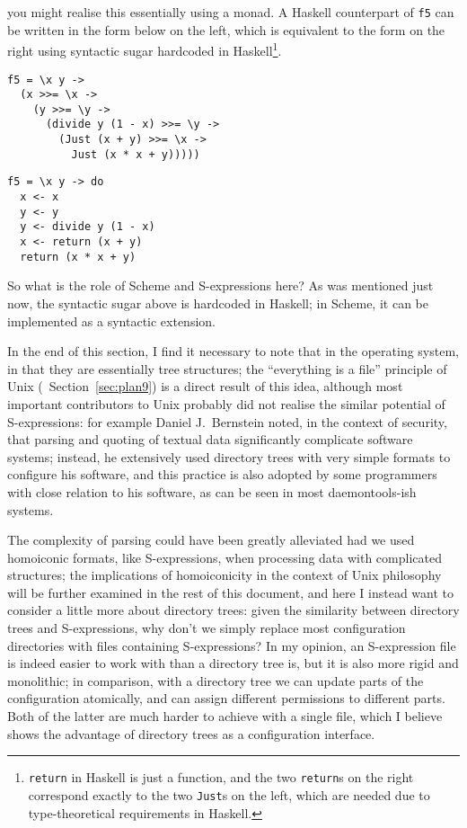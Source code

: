 you might realise this essentially using a monad.  A Haskell counterpart of
\verb|f5| can be written in the form below on the left, which is equivalent
to the form on the right using syntactic sugar hardcoded in Haskell\footnote%
{\texttt{return} in Haskell is just a function, and the two \texttt{return}s
on the right correspond exactly to the two \texttt{Just}s on the left,
which are needed due to type-theoretical requirements in Haskell.}.
\colskipa\begin{multicols}{2}
\begin{wquoting}
\begin{Verbatim}
f5 = \x y ->
  (x >>= \x ->
    (y >>= \y ->
      (divide y (1 - x) >>= \y ->
        (Just (x + y) >>= \x ->
          Just (x * x + y)))))
\end{Verbatim}
\end{wquoting}
\begin{wquoting}
\begin{Verbatim}
f5 = \x y -> do
  x <- x
  y <- y
  y <- divide y (1 - x)
  x <- return (x + y)
  return (x * x + y)
\end{Verbatim}
\end{wquoting}
\end{multicols}\colskipb\noindent%
So what is the role of Scheme and S-expressions here?  As was mentioned
just now, the syntactic sugar above is hardcoded in Haskell;
in Scheme, it can be implemented as a syntactic extension.

In the end of this section, I find it necessary to note that in the operating
system,  in that they are
essentially tree structures; the ``everything is a file'' principle of Unix
(\cf~Section~\ref{sec:plan9}) is a direct result of this idea, although
most important contributors to Unix probably did not realise the similar
potential of S-expressions: for example Daniel J.\ Bernstein noted, in the
context of security, that parsing and quoting of textual data significantly
complicate software systems; instead, he extensively
used directory trees with very simple formats to configure his software, and
this practice is also adopted by some programmers with close relation
to his software, as can be seen in most daemontools-ish systems.

The complexity of parsing could have been greatly alleviated had we used
homoiconic formats, like S-expressions, when processing data with complicated
structures; the implications of homoiconicity in the context of Unix philosophy
will be further examined in the rest of this document, and here I instead
want to consider a little more about directory trees: given the similarity
between directory trees and S-expressions, why don't we simply replace most
configuration directories with files containing S-expressions?  In my opinion,
an S-expression file is indeed easier to work with than a directory tree is,
but it is also more rigid and monolithic; in comparison, with a directory
tree we can update parts of the configuration atomically, and can assign
different permissions to different parts.  Both of the latter are much
harder to achieve with a single file, which I believe shows the
advantage of directory trees as a configuration interface.

